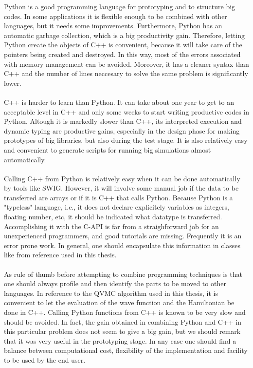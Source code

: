 Python is a good programming language for prototyping and to structure big codes. In some applications it is flexible enough to be combined with other languages, but it needs some improvements. Furthermore, Python has an automatic garbage collection, which is a big productivity gain. Therefore, letting Python create the objects of C++ is convenient, because it will take care of the pointers being created and destroyed. In this way, most of the errors associated with memory management can be avoided. Moreover, it has a cleaner syntax than C++ and the number of lines neccesary to solve the same problem is significantly lower.\\
\\
C++ is harder to learn than Python. It can take about one year to get to an acceptable level in C++ and only some weeks to start writing productive codes in Python. Altough it is markedly slower than C++, its interpreted execution and dynamic typing are productive gains, especially in the design phase for making prototypes of big libraries, but also during the test stage. It is also relatively easy and convenient to generate scripts for running big simulations almost automatically.\\
\\
Calling C++ from Python is relatively easy when it can be done automatically by tools like SWIG. However, it will involve some manual job if the data to be transferred are arrays or if it is C++ that calls Python. Because Python is a "typeless" language, i.e., it does not declare explicitely variables as integers, floating number, etc, it should be indicated what datatype is transferred. Accomplishing it with the C-API is far from a straighforward job for an unexperienced programmers, and good tutorials are missing. Frequently it is an error prone work. In general, one should encapsulate this information in classes like  from reference \cite{HPL2008} used in this thesis.\\
\\
As  rule of thumb before attempting to combine programming techniques is that one should always profile and then identify the parts to be moved to other languages. In reference to the QVMC algorithm used in this thesis, it is convenient to let the evaluation of the wave function and the Hamiltonian be done in C++. Calling Python functions from C++ is known to be very slow and should be avoided. In fact, the gain obtained in combining Python and C++ in this particular problem does not seem to give a big gain, but we should remark that it was very useful in the prototyping stage. In any case one should find a balance between computational cost, flexibility of the implementation and facility to be used by the end user. 


